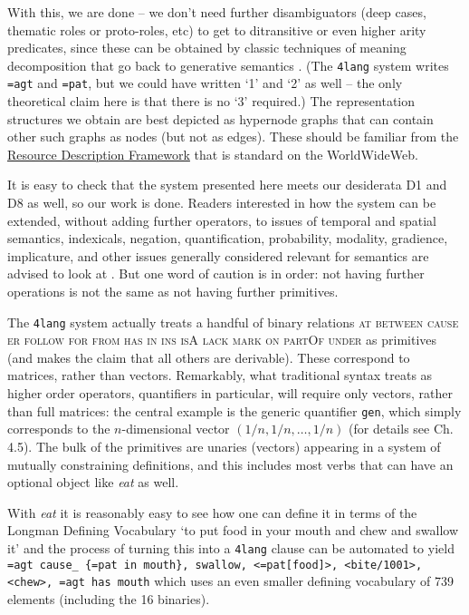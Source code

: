 \documentclass[output=paper,colorlinks=true,citecolor=brown]{langscibook}
\begin{document}
With this, we are done -- we don't need further disambiguators (deep cases,
thematic roles or proto-roles, etc) to get to ditransitive or even higher
arity predicates, since these can be obtained by classic techniques of meaning
decomposition that go back to generative semantics \citep{Kornai:2012}.  (The
\texttt{4lang} system writes \texttt{=agt} and \texttt{=pat}, but we could have
written `1' and `2' as well -- the only theoretical claim here is that there
is no `3' required.) The representation structures we obtain are best depicted
as hypernode graphs that can contain other such graphs as nodes (but not as
edges). These should be familiar from the
\href{https://en.wikipedia.org/wiki/Resource_Description_Framework}{Resource
  Description Framework} that is standard on the WorldWideWeb.

\bigskip\noindent It is easy to check that the system presented here meets our
desiderata D1 and D8 as well, so our work is done. Readers interested in how the
system can be extended, without adding further operators, to issues of
temporal and spatial semantics, indexicals, negation, quantification,
probability, modality, gradience, implicature, and other issues generally
considered relevant for semantics are advised to look at
\citet{Kornai:2022}. But one word of caution is in order: not having further
operations is not the same as not having further primitives.

The \texttt{4lang} system actually treats a handful of binary relations \textsc{at between cause er follow for from has in ins isA lack mark on partOf
  under} as primitives (and makes the claim that all others are
derivable). These correspond to matrices, rather than vectors. Remarkably,
what traditional syntax treats as higher order operators, quantifiers in
particular, will require only vectors, rather than full matrices: the central
example is the generic quantifier \texttt{gen}, which simply corresponds to the
$n$-dimensional vector $(1/n,1/n,\ldots,1/n)$ (for details see
\cite{Kornai:2022} Ch. 4.5). The bulk of the primitives are unaries (vectors)
appearing in a system of mutually constraining definitions, and this includes
most verbs that can have an optional object like \emph{eat} as well.

With \emph{eat} it is reasonably easy to see how one can define it in terms of
the Longman Defining Vocabulary `to put food in your mouth and chew and
swallow it' and the process of turning this into a \texttt{4lang} clause can be
automated \citep{Recski:2016d} to yield \texttt{=agt cause\_ \{=pat in mouth\},
  swallow, <=pat[food]>, <bite/1001>, <chew>, =agt has mouth} which uses an
even smaller defining vocabulary of 739 elements (including the 16 binaries).
\end{document}
